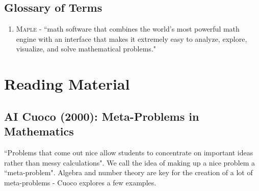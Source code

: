 \documentclass[12pt]{article}
\begin{document}
\subsection{Glossary of Terms}
\begin{enumerate}[itemsep=-2mm]
    \item \textsc{Maple} - ``math software that combines the world's most powerful math engine with an interface that makes it extremely easy to analyze, explore, visualize, and solve mathematical problems."
\end{enumerate}


\pagebreak 

\section{Reading Material}

\subsection{AI Cuoco (2000): Meta-Problems in Mathematics}
``Problems that come out nice allow students to concentrate on important ideas rather than messy calculations". We call the idea of making up a nice problem a ``meta-problem". Algebra and number theory are key for the creation of a lot of meta-problems - Cuoco explores a few examples.
\end{document}
